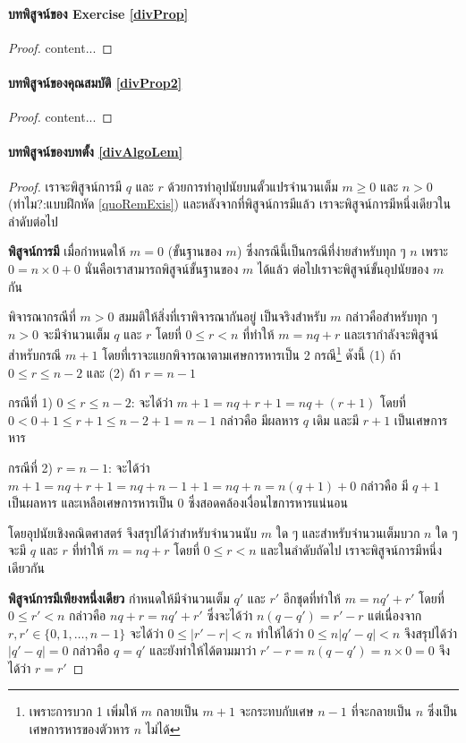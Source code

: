 \proofpart
\paragraph{บทพิสูจน์ของ Exercise \ref{divProp}}
\begin{proof}
	content...
\end{proof}

\paragraph{บทพิสูจน์ของคุณสมบัติ \ref{divProp2}}
\begin{proof}
	content...
\end{proof}

\paragraph{บทพิสูจน์ของบทตั้ง \ref{divAlgoLem}}
\begin{proof}
	เราจะพิสูจน์การมี $q$ และ $r$ ด้วยการทำอุปนัยบนตั้วแปรจำนวนเต็ม $m\geq 0$ และ $n>0$ (ทำไม?:แบบฝึกหัด \ref{quoRemExis}) และหลังจากที่พิสูจน์การมีแล้ว เราจะพิสูจน์การมีหนึ่งเดียวในลำดับต่อไป
	
	\textbf{พิสูจน์การมี}
	เมื่อกำหนดให้ $m = 0$ (ขั้นฐานของ $m$) ซึ่งกรณีนี้เป็นกรณีที่ง่ายสำหรับทุก ๆ $n$ เพราะ $0 = n\times 0 + 0$ นั่นคือเราสามารถพิสูจน์ขั้นฐานของ $m$ ได้แล้ว ต่อไปเราจะพิสูจน์ขั้นอุปนัยของ $m$ กัน
	
	พิจารณากรณีที่ $m > 0$ สมมติให้สิ่งที่เราพิจารณากันอยู่ เป็นจริงสำหรับ $m$ กล่าวคือสำหรับทุก ๆ $n>0$ จะมีจำนวนเต็ม $q$ และ $r$ โดยที่ $0\leq r < n$ ที่ทำให้ $m = nq + r$ และเรากำลังจะพิสูจน์สำหรับกรณี $m+1$ โดยที่เราจะแยกพิจารณาตามเศษการหารเป็น 2 กรณี\footnote{เพราะการบวก 1 เพิ่มให้ $m$ กลายเป็น $m+1$ จะกระทบกับเศษ $n-1$ ที่จะกลายเป็น $n$ ซึ่งเป็นเศษการหารของตัวหาร $n$ ไม่ได้} ดังนี้ (1) ถ้า $0\leq r\leq n-2$ และ (2) ถ้า $r= n-1$
	
	กรณีที่ 1) $0\leq r\leq n-2$: จะได้ว่า $m+1 = nq+r+1 = nq + (r+1)$ โดยที่ $0<0+1\leq r+1 \leq n-2 +1 = n-1$ กล่าวคือ มีผลหาร $q$ เดิม และมี $r+1$ เป็นเศษการหาร
	
	กรณีที่ 2) $r= n-1$: จะได้ว่า $m+1 = nq+r+1 = nq+n-1+1=nq+n=n(q+1) + 0$ กล่าวคือ มี $q+1$ เป็นผลหาร และเหลือเศษการหารเป็น $0$ ซึ่งสอดคล้องเงื่อนไขการหารแน่นอน
	
	โดยอุปนัยเชิงคณิตศาสตร์ จึงสรุปได้ว่าสำหรับจำนวนนับ $m$ ใด ๆ และสำหรับจำนวนเต็มบวก $n$ ใด ๆ จะมี $q$ และ $r$ ที่ทำให้ $m=nq + r$ โดยที่ $0\leq r < n$ และในลำดับถัดไป เราจะพิสูจน์การมีหนึ่งเดียวกัน
	
	\textbf{พิสูจน์การมีเพียงหนึ่งเดียว} กำหนดให้มีจำนวนเต็ม $q'$ และ $r'$ อีกชุดที่ทำให้ $m=nq' + r'$ โดยที่ $0\leq r' < n$ กล่าวคือ $ nq + r = nq' + r'$ ซึ่งจะได้ว่า $n(q-q') = r' - r$
	แต่เนื่องจาก $r,r'\in\{0,1,\dots,n-1\}$ จะได้ว่า $0\leq|r'-r|<n$ ทำให้ได้ว่า $0\leq n|q'-q|<n$ จึงสรุปได้ว่า $|q'-q| = 0$ กล่าวคือ $q=q'$ และยังทำให้ได้ตามมาว่า $r'-r = n(q-q') = n\times 0 = 0$ จึงได้ว่า $r=r'$
\end{proof}




